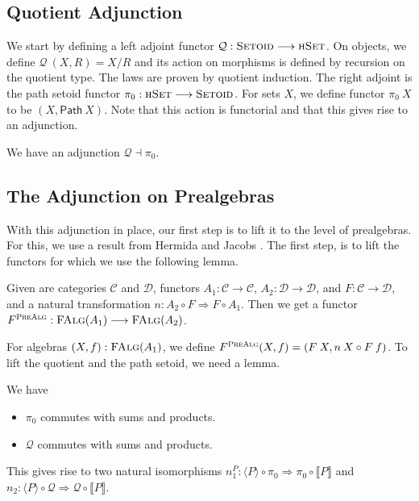 \documentclass[9pt]{entcs}
\newcommand{\type}[1]{\textsc{#1}}
\newcommand{\category}[1]{\textsc{#1}}
\newcommand{\function}[1]{\mathsf{#1}}
\newcommand{\hset}{\type{hSet}} %
\newcommand{\0}{\textbf{0}} %
\newcommand{\setquot}[2]{#1 / #2} %
\newcommand{\compm}[2]{#2 \circ #1} %
\newcommand{\setoids}{\category{Setoid}} %
\newcommand{\functor}[2]{#1 \longrightarrow #2} %
\newcommand{\compf}[2]{#2 \circ #1} %
\newcommand{\nattrans}[2]{#1 \Longrightarrow #2} %
\newcommand{\falg}[1]{\category{FAlg}(#1)} %
\newcommand{\adj}[2]{#1 \dashv #2} %
\newcommand{\pathR}[1]{\function{Path} \> #1} %
\newcommand{\semP}[1]{\llbracket #1 \rrbracket} %
\newcommand{\semPT}[1]{\langle #1 \rangle} %
\newcommand{\quotF}{\mathcal{Q}}
\newcommand{\pathF}{\pi_0}
\begin{document}
\subsection{Quotient Adjunction}
We start by defining a left adjoint functor $\quotF : \functor{\setoids}{\hset}$.
On objects, we define $\quotF \> (X , R) = \setquot{X}{R}$ and its action on morphisms is defined by recursion on the quotient type.
The laws are proven by quotient induction.
The right adjoint is the path setoid functor $\pathF : \functor{\hset}{\setoids}$.
For sets $X$, we define functor $\pathF \> X$ to be $(X, \pathR{X})$.
Note that this action is functorial and that this gives rise to an adjunction.

\begin{lemma}
We have an adjunction $\adj{\quotF}{\pathF}$.
\end{lemma}

\subsection{The Adjunction on Prealgebras}
With this adjunction in place, our first step is to lift it to the level of prealgebras.
For this, we use a result from Hermida and Jacobs \cite{hermida1998structural}.
The first step, is to lift the functors for which we use the following lemma.

\begin{lemma}
\label{lem:prealgadj}
Given are categories $\mathcal{C}$ and $\mathcal{D}$, functors $A_1 : \functor{\mathcal{C}}{\mathcal{C}}$, $A_2 : \functor{\mathcal{D}}{\mathcal{D}}$, and $F : \functor{\mathcal{C}}{\mathcal{D}}$, and a natural transformation $n : \nattrans{\compf{F}{A_2}}{\compf{A_1}{F}}$.
Then we get a functor $F^{\category{PreAlg}} : \functor{\falg{A_1}}{\falg{A_2}}$.
\end{lemma}

For algebras $(X, f) : \falg{A_1}$, we define $F^{\category{PreAlg}}(X,f) = (F \> X, \compm{F \> f}{n \> X})$.
To lift the quotient and the path setoid, we need a lemma.

\begin{lemma}
\label{lem:comm}
We have
\begin{itemize}
	\item $\pathF$ commutes with sums and products.
	\item $\quotF$ commutes with sums and products.
\end{itemize}
This gives rise to two natural isomorphisms $n_1^P : \nattrans{\compf{\pathF}{\semPT{P}}}{\compf{\semP{P}}{\pathF}}$ and $n_2 : \nattrans{\compf{\quotF}{\semPT{P}}}{\compf{\semP{P}}{\quotF}}$.
\end{lemma}
\end{document}
